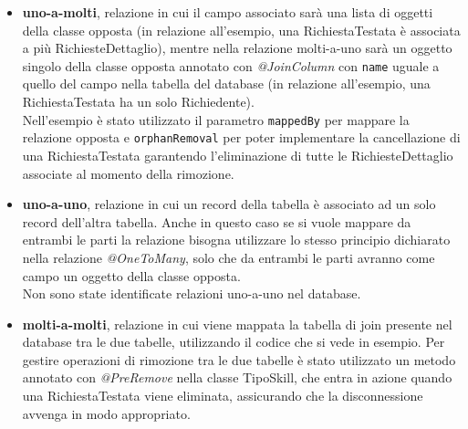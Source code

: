 \begin{itemize}
\item \textbf{uno-a-molti}, relazione in cui il campo associato sarà una lista di oggetti della classe opposta (in relazione all'esempio, una RichiestaTestata è associata a più RichiesteDettaglio), mentre nella relazione molti-a-uno sarà un oggetto singolo della classe opposta annotato con \textit{@JoinColumn} con \texttt{name} uguale a quello del campo nella tabella del database (in relazione all'esempio, una RichiestaTestata ha un solo Richiedente).\\
Nell'esempio è stato utilizzato il parametro \texttt{mappedBy} per mappare la relazione opposta e \texttt{orphanRemoval} per poter implementare la cancellazione di una RichiestaTestata garantendo l'eliminazione di tutte le RichiesteDettaglio associate al momento della rimozione.
\item \textbf{uno-a-uno}, relazione in cui un record della tabella è associato ad un solo record dell'altra tabella. Anche in questo caso se si vuole mappare da entrambi le parti la relazione bisogna utilizzare lo stesso principio dichiarato nella relazione \textit{@OneToMany}, solo che da entrambi le parti avranno come campo un oggetto della classe opposta.\\
Non sono state identificate relazioni uno-a-uno nel database.
\item \textbf{molti-a-molti}, relazione in cui viene mappata la tabella di join presente nel database tra le due tabelle, utilizzando il codice che si vede in esempio.
Per gestire operazioni di rimozione tra le due tabelle è stato utilizzato un metodo annotato con \textit{@PreRemove} nella classe TipoSkill, che entra in azione quando una RichiestaTestata viene eliminata, assicurando che la disconnessione avvenga in modo appropriato.
\end{itemize}

